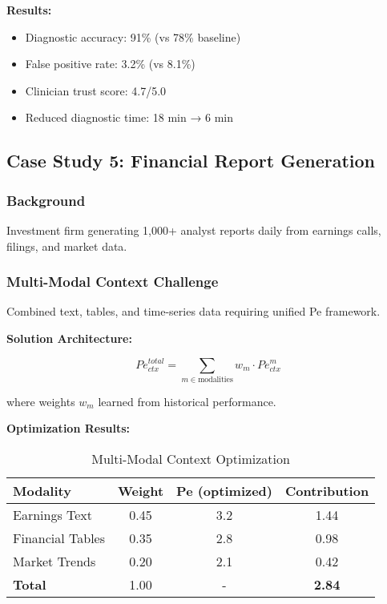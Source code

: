 \documentclass[conference]{IEEEtran}
\begin{document}
\textbf{Results:}
\begin{itemize}
\item Diagnostic accuracy: 91\% (vs 78\% baseline)
\item False positive rate: 3.2\% (vs 8.1\%)
\item Clinician trust score: 4.7/5.0
\item Reduced diagnostic time: 18 min → 6 min
\end{itemize}

\subsection{Case Study 5: Financial Report Generation}

\subsubsection{Background}

Investment firm generating 1,000+ analyst reports daily from earnings calls, filings, and market data.

\subsubsection{Multi-Modal Context Challenge}

Combined text, tables, and time-series data requiring unified Pe framework.

\textbf{Solution Architecture:}

\begin{equation}
Pe_{ctx}^{total} = \sum_{m \in \text{modalities}} w_m \cdot Pe_{ctx}^m
\end{equation}

where weights $w_m$ learned from historical performance.

\textbf{Optimization Results:}

\begin{table}[h]
\centering
\caption{Multi-Modal Context Optimization}
\begin{tabular}{@{}lccc@{}}
\toprule
Modality & Weight & Pe (optimized) & Contribution \\
\midrule
Earnings Text & 0.45 & 3.2 & 1.44 \\
Financial Tables & 0.35 & 2.8 & 0.98 \\
Market Trends & 0.20 & 2.1 & 0.42 \\
\midrule
\textbf{Total} & 1.00 & - & \textbf{2.84} \\
\bottomrule
\end{tabular}
\end{table}
\end{document}
